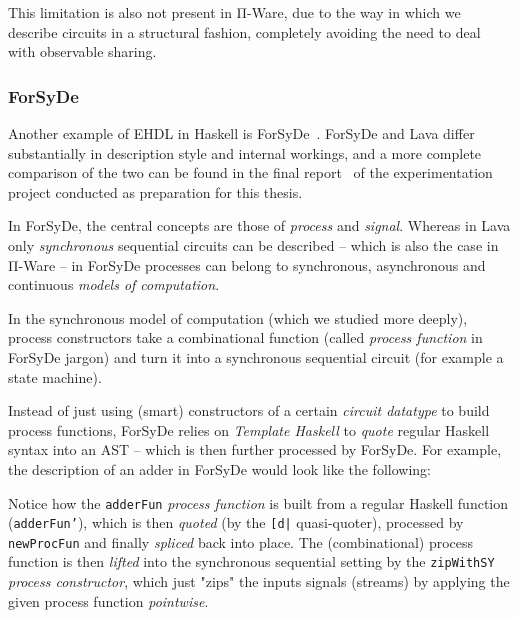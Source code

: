            \begin{center}
            \end{center}

            This limitation is also not present in Π-Ware, due to the way in which we describe circuits
            in a structural fashion, completely avoiding the need to deal with observable sharing.


            \subsubsection{ForSyDe}
            \label{subsubsec:forsyde}
            Another example of \ac{EHDL} in Haskell is ForSyDe~\cite{forsyde1999}.
            ForSyDe and Lava differ substantially in description style and internal workings,
            and a more complete comparison of the two can be found
            in the final report~\cite{functional-hardware-survey}
            of the experimentation project conducted as preparation for this thesis.

            In ForSyDe, the central concepts are those of \emph{process} and \emph{signal}.
            Whereas in Lava only \emph{synchronous} sequential circuits can be described – which is
            also the case in Π-Ware – in ForSyDe processes can belong to synchronous,
            asynchronous and continuous \emph{models of computation}.

            In the synchronous model of computation (which we studied more deeply),
            process constructors take a combinational function (called \emph{process function} in
            ForSyDe jargon) and turn it into a synchronous sequential circuit
            (for example a state machine).

            Instead of just using (smart) constructors of a certain \emph{circuit datatype} to build
            process functions, ForSyDe relies on \emph{Template Haskell} to
            \emph{quote} regular Haskell syntax into an \ac{AST} – which is then further processed by ForSyDe.
            For example, the description of an adder in ForSyDe would look like the following:

            \begin{center}
            \end{center}

            Notice how the \texttt{adderFun} \emph{process function} is built from a regular Haskell function
            (\texttt{adderFun'}), which is then \emph{quoted} (by the \texttt{[d|} quasi-quoter),
            processed by \texttt{newProcFun} and finally \emph{spliced} back into place.
            The (combinational) process function is then \emph{lifted} into the synchronous sequential setting
            by the \texttt{zipWithSY} \emph{process constructor},
            which just "zips" the inputs signals (streams) by applying the given process function \emph{pointwise}.

